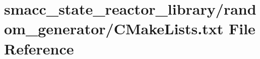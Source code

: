 \hypertarget{state__reactor__library_2random__generator_2CMakeLists_8txt}{}\section{smacc\+\_\+state\+\_\+reactor\+\_\+library/random\+\_\+generator/\+C\+Make\+Lists.txt File Reference}
\label{state__reactor__library_2random__generator_2CMakeLists_8txt}
